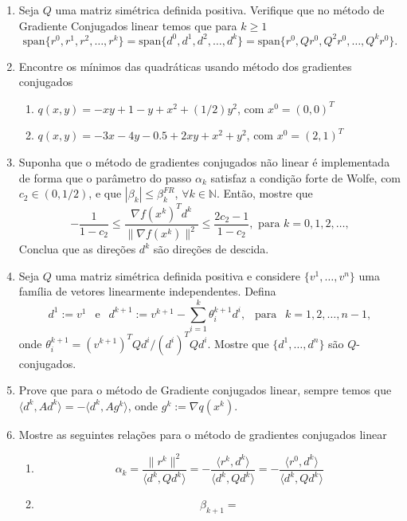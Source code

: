 \documentclass[a4paper,latin]{article}
\begin{document}
\begin{enumerate}
     \item Seja $Q$ uma matriz simétrica definida positiva. Verifique 
    que no método de Gradiente Conjugados linear temos que para $k \geq 1$
    $$\text{span}\{r^{0}, r^{1}, r^2,  \dots, r^{k}\}=
    \text{span}\{d^{0}, d^{1}, d^2, \dots, d^{k}\}=
    \text{span}\{r^{0},  Qr^{0}, Q^{2} r^{0}, \dots, Q^{k} r^{0}\}.$$ 
    \item Encontre os mínimos das quadráticas usando método dos gradientes conjugados
    \begin{enumerate}
    	\item $q(x,y)=-xy+1-y+x^2+(1/2)y^2$, com $x^{0}=(0,0)^{T}$ 
    	\item $q(x,y)=-3x-4y-0.5+2xy+x^2+y^2$, com $x^0=(2,1)^{T}$
    \end{enumerate}
    \item  
    Suponha que o método de gradientes conjugados não linear é implementada de forma que o parâmetro do passo $\alpha_{k}$ satisfaz a condição forte de Wolfe, com $c_{2}\in (0,1/2)$, e que $|\beta_{k}|\leq \beta_{k}^{FR}$, $\forall k \in \mathbb{N}$. Então, mostre que 
    $$ -\frac{1}{1-c_2} \leq \frac{\nabla f(x^k)^{T}d^{k}}{\|\nabla f(x^k)\|^{2}} \leq \frac{2c_2-1}{1-c_2}, \text{ para } k=0,1,2, \dots,  $$
    Conclua que as direções $d^{k}$ são direções de descida. 
    \item Seja $Q$ uma matriz simétrica definida positiva e considere 
    $\{v^1,\dots,v^n\}$ uma família de vetores linearmente independentes. 
    Defina 
    $$d^{1}:=v^{1} \  \ \text{ e } \ \ 
    d^{k+1}:=v^{k+1}-\sum_{i=1}^{k} \theta^{k+1}_{i} d^{i},
    \ \ \text{ para } \ \ k=1,2,\dots, n-1, $$ 
    onde $\theta^{k+1}_{i}=(v^{k+1})^{T}Qd^i/(d^{i})^{T}Qd^{i}$. 
    Mostre que $\{d^1,\dots,d^n\}$ são $Q$-conjugados.
    \item Prove que para o método de Gradiente conjugados linear, 
    sempre temos que 
    $\langle d^{k}, A d^{k} \rangle=-\langle d^{k}, A g^{k} \rangle$, 
    onde $g^{k}:=\nabla q(x^k)$. %
    \item Mostre as seguintes relações para o método de gradientes conjugados linear
    \begin{enumerate}
    	\item 
    	$$\alpha_{k}=
    	\frac{\|r^{k}\|^{2}}{\langle d^{k},Qd^{k}\rangle}=
    	-\frac{\langle r^{k},d^{k}\rangle}{\langle d^{k}, Qd^{k}\rangle}=
    	-\frac{\langle r^{0},d^{k}\rangle}{\langle d^{k}, Qd^{k}\rangle}$$
    	\item  
    	$$\beta_{k+1}=
$$
\end{enumerate}
\end{enumerate}
\end{document}

